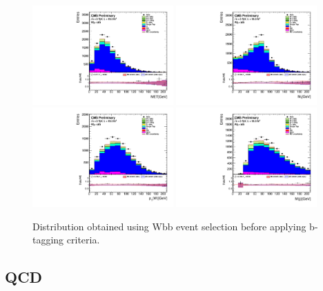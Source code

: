 \begin{figure}[htbp]
	\centering
		\includegraphics[width=0.48\textwidth]{Figures/Results/TT_GetMET_doQCD1.pdf}
		\includegraphics[width=0.48\textwidth]{Figures/Results/TT_GetVMt_doQCD1.pdf}
		\includegraphics[width=0.48\textwidth]{Figures/Results/TT_GetWpt_doQCD1.pdf}
		\includegraphics[width=0.48\textwidth]{Figures/Results/TT_H_mass_doQCD1.pdf}		
	\caption[Distribution obtained using Wbb event selection before applying b-tagging criteria.]{Distribution obtained using Wbb event selection before applying b-tagging criteria.}
	\label{fig:Wjets}
\end{figure}

\subsection{QCD}

